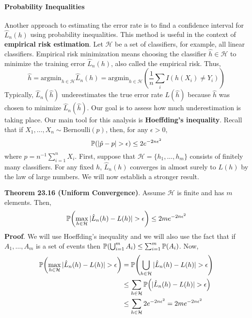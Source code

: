 \paragraph{Probability Inequalities}\label{probability:inequalities}
Another approach to estimating the error rate is to find a confidence
interval for \(\hat{L}_{n}(h)\) using probability inequalities. This
method is useful in the context of \textbf{empirical risk estimation}.
Let \(\mathcal{H}\) be a set of classifiers, for example, all linear
classifiers. Empirical risk minimization means choosing the classifier
\(\hat{h} \in \mathcal{H}\) to minimize the training error
\(\hat{L}_{n}(h)\), also called the empirical risk. Thus,
\[
\hat{h} = \text{argmin}_{h \in \mathcal{H}} \hat{L}_{n}(h) 
= \text{argmin}_{h \in \mathcal{H}} \left( \frac{1}{n} \sum_{i} I(h(X_{i}) \neq Y_{i}) \right)
\]
Typically, \(\hat{L}_{n}(\hat{h})\) underestimates the true error rate
\(L(\hat{h})\) because \(\hat{h}\) was chosen to minimize
\(\hat{L}_{n}(\hat{h})\). Our goal is to assess how much underestimation
is taking place. Our main tool for this analysis is \textbf{Hoeffding's
inequality}. Recall that if
\(X_{1}, \dots, X_{n} \sim \text{Bernoulli}(p)\), then, for any
\(\epsilon > 0\),
\[
\operatorname{\mathbb{P}}(|\hat{p} - p| > \epsilon) \leq 2 e^{ -2 n \epsilon^{2} }
\]
where \(\hat{p} = n^{-1} \sum_{i=1}^{n} X_{i}\).
First, suppose that \(\mathcal{H} = \{ h_{1}, \dots, h_m \}\) consists of
finitely many classifiers. For any fixed \(h\), \(\hat{L}_{n}(h)\)
converges in almost surely to \(L(h)\) by the law of large numbers. We
will now establish a stronger result.

\textbf{Theorem 23.16 (Uniform Convergence)}. Assume \(\mathcal{H}\) is
finite and has \(m\) elements. Then,
\[
\PROB \left( \max_{h \in \mathcal{H}} |\hat{L}_{n}(h) - L(h) | > \epsilon \right) \leq 2 m e^{-2 n \epsilon^{2}}
\]
\textbf{Proof}. We will use Hoeffding's inequality and we will also use
the fact that if \(A_{1}, \dots, A_m\) is a set of events then
\(\operatorname{\mathbb{P}}(\bigcup_{i=1}^m A_{i}) \leq \sum_{i=1}^m \operatorname{\mathbb{P}}(A_{i})\).
Now,
\begin{align*}
\PROB \left( \max_{h \in \mathcal{H}} |\hat{L}_{n}(h) - L(h) | > \epsilon \right)
&= \PROB \left( \bigcup_{h \in \mathcal{H}} |\hat{L}_{n}(h) - L(h) | > \epsilon \right) \\
& \leq \sum_{h \in \mathcal{H}} \PROB \left( |\hat{L}_{n}(h) - L(h) | > \epsilon \right) \\
& \leq \sum_{h \in \mathcal{H}} 2 e^{-2 n \epsilon^{2}} = 2 m e^{-2 n \epsilon^{2}}
\end{align*}

